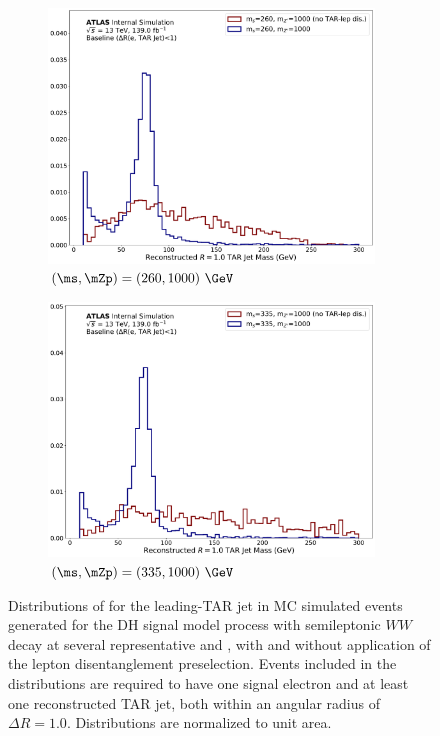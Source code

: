 \begin{figure}[H]
\centering
\begin{subfigure}{0.49\textwidth}
   \includegraphics[width = 0.95\textwidth]{Figures/5/zp1000_dm200_dh260_disentanglement.pdf}
   \caption{\((\ms, \mZp) = (260, 1000)~\GeV\)}
   \label{fig:TARdisentaglementplots_zp1000_dh260}
\end{subfigure}
\begin{subfigure}{0.49\textwidth}
   \includegraphics[width = 0.95\textwidth]{Figures/5/zp1000_dm200_dh335_disentanglement.pdf}
   \caption{\((\ms, \mZp) = (335, 1000)~\GeV\)}
   \label{fig:TARdisentaglementplots_zp1000_dh335}
\end{subfigure}
   \caption{Distributions of \mTAR for the leading-\pt TAR jet in MC simulated events generated for the DH signal model process with semileptonic \(WW\) decay at several representative \ms and \mZp, with and without application of the lepton disentanglement preselection. Events included in the distributions are required to have one signal electron and at least one reconstructed TAR jet, both within an angular radius of \(\Delta R=1.0\). Distributions are normalized to unit area.}
   \label{fig:TARdisentaglementplots}
\end{figure}

